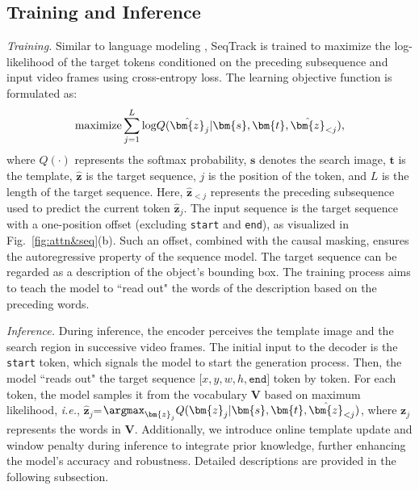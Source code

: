 \subsection{Training and Inference}
\label{subsec:traininginference}

\textit{Training.} Similar to language modeling \cite{2017Attention}, SeqTrack is trained to maximize the log-likelihood of the target tokens conditioned on the preceding subsequence and input video frames using cross-entropy loss. The learning objective function is formulated as:
\vspace{-2mm}
\begin{equation}
\vspace{-3mm}
\begin{split}
\label{equation:objective}
{\rm{maximize}} \sum_{j=1}^{L}{\rm{log}}Q(\hat{\bm{z}}_j|\bm{s},\bm{t},\hat{\bm{z}}_{< j}), 
\end{split}
\end{equation}
where $Q(\cdot)$ represents the softmax probability, $\bm{s}$ denotes the search image, $\bm{t}$ is the template, $\hat{\bm{z}}$ is the target sequence, $j$ is the position of the token, and $L$ is the length of the target sequence.
Here, $\hat{\bm{z}}_{< j}$ represents the preceding subsequence used to predict the current token $\hat{\bm{z}}_j$.
The input sequence is the target sequence with a one-position offset (excluding \texttt{start} and \texttt{end}), as visualized in Fig.~\ref{fig:attn&seq}(b). 
Such an offset, combined with the causal masking, ensures the autoregressive property of the sequence model. 
The target sequence can be regarded as a description of the object's bounding box.
The training process aims to teach the model to ``read out" the words of the description based on the preceding words.

\textit{Inference.}
During inference, the encoder perceives the template image and the search region in successive video frames.
The initial input to the decoder is the \texttt{start} token, which signals the model to start the generation process.
Then, the model ``reads out" the target sequence $[x,$$y,$$w,$$h,$$\texttt{end}]$ token by token.
For each token, the model samples it from the vocabulary $\bm{V}$ based on maximum likelihood, \emph{i.e.}, 
$\hat{\bm{z}}_{j}$=${\argmax}_{\bm{z}_{j}}
Q(\bm{z}_{j}|\bm{s},\bm{t},\hat{\bm{z}}_{< j})$, where ${\bm{z}}_{j}$ represents the words in $\bm{V}$.
Additionally, we introduce online template update and window penalty during inference to integrate prior knowledge,  further enhancing the model's accuracy and robustness. Detailed descriptions are provided in the following subsection.


